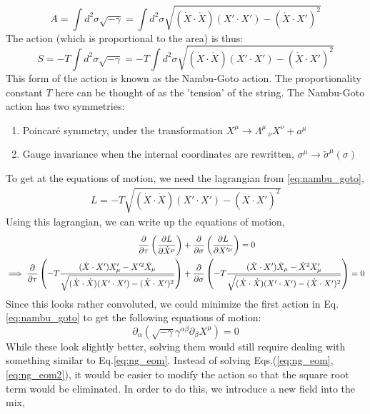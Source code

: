 \documentclass{article}
\providecommand{\brak}[1]{\ensuremath{\left(#1\right)}} %
\begin{document}
\begin{equation}
	A = \int d^2\sigma \sqrt{-\gamma} = \int d^2\sigma \sqrt{(\dot{X}\cdot\dot{X})(X'\cdot X') - (\dot{X}\cdot X')^2
}
\end{equation}
The action (which is proportional to the area) is thus:
\begin{equation}
	S = -T\int d^2\sigma \sqrt{-\gamma} = -T\int d^2\sigma \sqrt{(\dot{X}\cdot\dot{X})(X'\cdot X') - (\dot{X}\cdot X')^2}\label{eq:nambu_goto}
\end{equation}
This form of the action is known as the Nambu-Goto action. The proportionality constant $T$ here can be thought of as the 'tension' of the string. The Nambu-Goto action has two symmetries:
\begin{enumerate}
	\item Poincar\'e symmetry, under the transformation $X^\mu \rightarrow \Lambda^\mu\,_\nu X^\nu + a^\mu$
	\item Gauge invariance when the internal coordinates are rewritten, $\sigma^\mu \rightarrow \tilde{\sigma}^\mu(\sigma)$
\end{enumerate}
To get at the equations of motion, we need the lagrangian from \eqref{eq:nambu_goto},
\begin{align}
	L = -T\sqrt{(\dot{X}\cdot\dot{X})(X'\cdot X') - (\dot{X}\cdot X')^2}
\end{align}
Using this lagrangian, we can write up the equations of motion,
\begin{align}
	\pdv{}{\tau}\brak{\pdv{L}{\dot{X}^\mu}}&+\pdv{}{\sigma}\brak{\pdv{L}{X'^\mu}}=0\\
	\implies \pdv{}{\tau}\brak{-T\frac{(\dot{X}\cdot X')X'_\mu-X'^2\dot{X}_\mu}{\sqrt{(\dot{X}\cdot\dot{X})(X'\cdot X') - (\dot{X}\cdot X')^2}}}&+\pdv{}{\sigma}\brak{-T\frac{(\dot{X}\cdot X')\dot{X}_\mu-\dot{X}^2X'_\mu}{\sqrt{(\dot{X}\cdot\dot{X})(X'\cdot X') - (\dot{X}\cdot X')^2}}} =0 \label{eq:ng_eom}
\end{align}
Since this looks rather convoluted, we could minimize the first action in Eq.\eqref{eq:nambu_goto} to get the following equations of motion:
\begin{equation}
	\partial_\alpha\brak{\sqrt{-\gamma}\gamma^{\alpha\beta}\partial_\beta X^\mu} =0\label{eq:ng_eom2}
\end{equation}
While these look slightly better, solving them would still require dealing with something similar to Eq.\eqref{eq:ng_eom}. Instead of solving Eqs.(\ref{eq:ng_eom},\ref{eq:ng_eom2}), it would be easier to modify the action so that the square root term would be eliminated. In order to do this, we introduce a new field into the mix,
\end{document}

